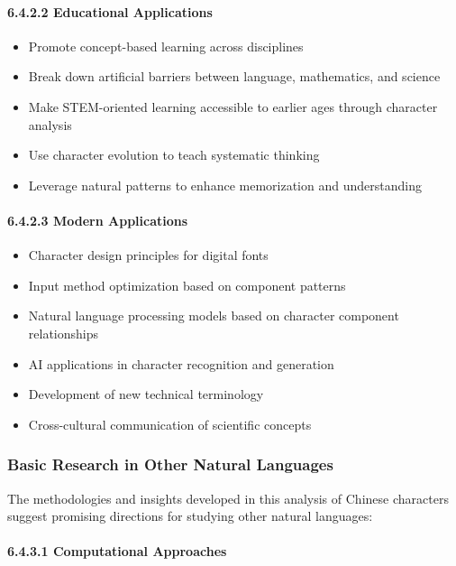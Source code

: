 \documentclass[11pt,letterpaper]{article}
\begin{document}
\paragraph{6.4.2.2 Educational
Applications}\label{educational-applications}

\begin{itemize}
\tightlist
\item
  Promote concept-based learning across disciplines
\item
  Break down artificial barriers between language, mathematics, and
  science
\item
  Make STEM-oriented learning accessible to earlier ages through
  character analysis
\item
  Use character evolution to teach systematic thinking
\item
  Leverage natural patterns to enhance memorization and understanding
\end{itemize}

\paragraph{6.4.2.3 Modern Applications}\label{modern-applications}

\begin{itemize}
\tightlist
\item
  Character design principles for digital fonts
\item
  Input method optimization based on component patterns
\item
  Natural language processing models based on character component
  relationships
\item
  AI applications in character recognition and generation
\item
  Development of new technical terminology
\item
  Cross-cultural communication of scientific concepts
\end{itemize}

\subsubsection{Basic Research in Other Natural Languages}\label{basic-research-in-other-natural-languages}

The methodologies and insights developed in this analysis of Chinese
characters suggest promising directions for studying other natural
languages:

\paragraph{6.4.3.1 Computational Approaches}\label{computational-approaches}
\end{document}
